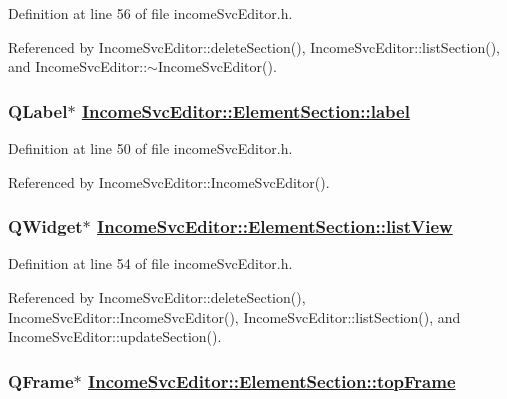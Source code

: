 Definition at line 56 of file income\-Svc\-Editor.h.

Referenced by Income\-Svc\-Editor::delete\-Section(), Income\-Svc\-Editor::list\-Section(), and Income\-Svc\-Editor::$\sim$Income\-Svc\-Editor().\hypertarget{structIncomeSvcEditor_1_1ElementSection_o2}{
\subsubsection[label]{\setlength{\rightskip}{0pt plus 5cm}QLabel$\ast$ \hyperlink{structIncomeSvcEditor_1_1ElementSection_o2}{Income\-Svc\-Editor::Element\-Section::label}}}
\label{structIncomeSvcEditor_1_1ElementSection_o2}


Definition at line 50 of file income\-Svc\-Editor.h.

Referenced by Income\-Svc\-Editor::Income\-Svc\-Editor().\hypertarget{structIncomeSvcEditor_1_1ElementSection_o6}{
\subsubsection[listView]{\setlength{\rightskip}{0pt plus 5cm}QWidget$\ast$ \hyperlink{structIncomeSvcEditor_1_1ElementSection_o6}{Income\-Svc\-Editor::Element\-Section::list\-View}}}
\label{structIncomeSvcEditor_1_1ElementSection_o6}


Definition at line 54 of file income\-Svc\-Editor.h.

Referenced by Income\-Svc\-Editor::delete\-Section(), Income\-Svc\-Editor::Income\-Svc\-Editor(), Income\-Svc\-Editor::list\-Section(), and Income\-Svc\-Editor::update\-Section().\hypertarget{structIncomeSvcEditor_1_1ElementSection_o0}{
\subsubsection[topFrame]{\setlength{\rightskip}{0pt plus 5cm}QFrame$\ast$ \hyperlink{structIncomeSvcEditor_1_1ElementSection_o0}{Income\-Svc\-Editor::Element\-Section::top\-Frame}}}
\label{structIncomeSvcEditor_1_1ElementSection_o0}


